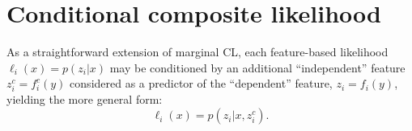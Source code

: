 \documentclass[english]{scrartcl}
\begin{document}




\appendix

\section{Conditional composite likelihood}
\label{sec:conditional}

As a straightforward  extension of marginal CL, each feature-based likelihood $\ell_i(x)=p(z_i|x)$ may be conditioned by an additional ``independent'' feature $z^c_i = f^c_i(y)$ considered as a predictor of the ``dependent'' feature, $z_i=f_i(y)$, yielding the more general form:
\begin{equation}
\label{eq:cond_feat_lik}
\ell_i(x) = p(z_i|x,z^c_i).
\end{equation}
\end{document}
